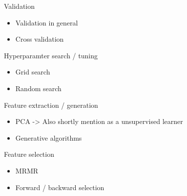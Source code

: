     \begin{frame}{Validation}
      \begin{itemize}
        \item Validation in general
        \item Cross validation
      \end{itemize}
    \end{frame}

    \begin{frame}{Hyperparamter search / tuning}
      \begin{itemize}
        \item Grid search
        \item Random search
      \end{itemize}
    \end{frame}

    \begin{frame}{Feature extraction / generation}
      \begin{itemize}
        \item PCA -> Also shortly mention as a unsupervised learner
        \item Generative algorithms
      \end{itemize}
    \end{frame}

    \begin{frame}{Feature selection}
      \begin{itemize}
        \item MRMR
        \item Forward / backward selection
      \end{itemize}
    \end{frame}




